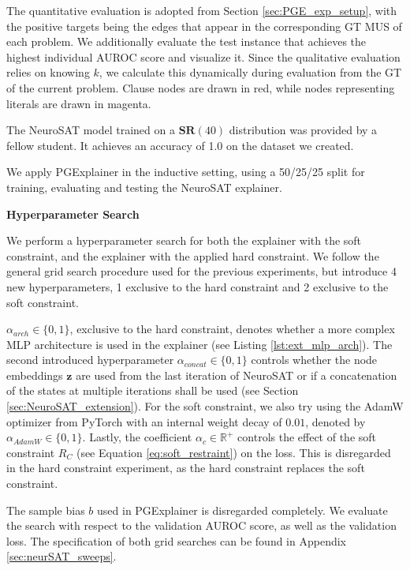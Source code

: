 The quantitative evaluation is adopted from Section \ref{sec:PGE_exp_setup}, with the positive targets being the edges that appear in the corresponding \ac{GT} MUS of each problem. We additionally evaluate the test instance that achieves the highest individual AUROC score and visualize it. Since the qualitative evaluation relies on knowing $k$, we calculate this dynamically during evaluation from the \ac{GT} of the current problem. Clause nodes are drawn in red, while nodes representing literals are drawn in magenta. \bigskip

The NeuroSAT model trained on a $\textbf{SR}(40)$ distribution was provided by a fellow student. It achieves an accuracy of 1.0 on the dataset we created.

We apply PGExplainer in the inductive setting, using a 50/25/25 split for training, evaluating and testing the NeuroSAT explainer. \bigskip

\textbf{Hyperparameter Search}\par
We perform a hyperparameter search for both the explainer with the soft constraint, and the explainer with the applied hard constraint. We follow the general grid search procedure used for the previous experiments, but introduce 4 new hyperparameters, 1 exclusive to the hard constraint and 2 exclusive to the soft constraint. 

$\alpha_{arch} \in \{0,1\}$, exclusive to the hard constraint, denotes whether a more complex MLP architecture is used in the explainer (see Listing \ref{lst:ext_mlp_arch}). The second introduced hyperparameter $\alpha_{concat} \in \{0,1\}$ controls whether the node embeddings $\mathbf{z}$ are used from the last iteration of NeuroSAT or if a concatenation of the states at multiple iterations shall be used (see Section \ref{sec:NeuroSAT_extension}). For the soft constraint, we also try using the AdamW \cite{loshchilov2017decoupled} optimizer from PyTorch with an internal weight decay of $0.01$, denoted by $\alpha_{AdamW} \in \{0,1\}$. Lastly, the coefficient $\alpha_{c} \in \mathbb{R}^+$ controls the effect of the soft constraint $R_C$ (see Equation \ref{eq:soft_restraint}) on the loss. This is disregarded in the hard constraint experiment, as the hard constraint replaces the soft constraint. 

The sample bias $b$ used in PGExplainer is disregarded completely. We evaluate the search with respect to the validation AUROC score, as well as the validation loss. The specification of both grid searches can be found in Appendix \ref{sec:neurSAT_sweeps}.


